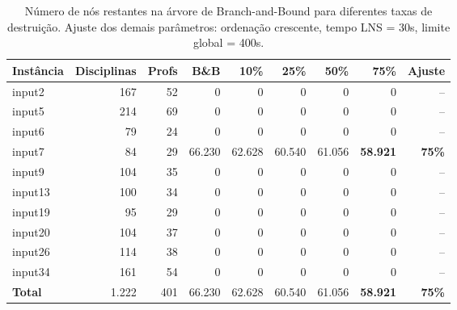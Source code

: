 \begin{table}[htbp]
\centering
\caption{Número de nós restantes na árvore de Branch-and-Bound para diferentes taxas de destruição. Ajuste dos demais parâmetros: ordenação crescente, tempo LNS = 30s, limite global = 400s.}
\label{tab:lns_cand_nodes}
\small
\begin{tabular}{@{}lrrrrrrrr@{}}
\toprule
\textbf{Instância} & \textbf{Disciplinas} & \textbf{Profs} & \textbf{B\&B} & \textbf{10\%} & \textbf{25\%} & \textbf{50\%} & \textbf{75\%} & \textbf{Ajuste} \\
\midrule
input2  & 167 & 52 & 0      & 0      & 0      & 0      & 0      & -- \\
input5  & 214 & 69 & 0      & 0      & 0      & 0      & 0      & -- \\
input6  & 79  & 24 & 0      & 0      & 0      & 0      & 0      & -- \\
input7  & 84  & 29 & 66.230 & 62.628 & 60.540 & 61.056 & \textbf{58.921} & \textbf{75\%} \\
input9  & 104 & 35 & 0      & 0      & 0      & 0      & 0      & -- \\
input13 & 100 & 34 & 0      & 0      & 0      & 0      & 0      & -- \\
input19 & 95  & 29 & 0      & 0      & 0      & 0      & 0      & -- \\
input20 & 104 & 37 & 0      & 0      & 0      & 0      & 0      & -- \\
input26 & 114 & 38 & 0      & 0      & 0      & 0      & 0      & -- \\
input34 & 161 & 54 & 0      & 0      & 0      & 0      & 0      & -- \\
\midrule
\textbf{Total}  & 1.222 & 401 & 66.230 & 62.628 & 60.540 & 61.056 & \textbf{58.921} & \textbf{75\%} \\
\bottomrule
\end{tabular}
\end{table}
